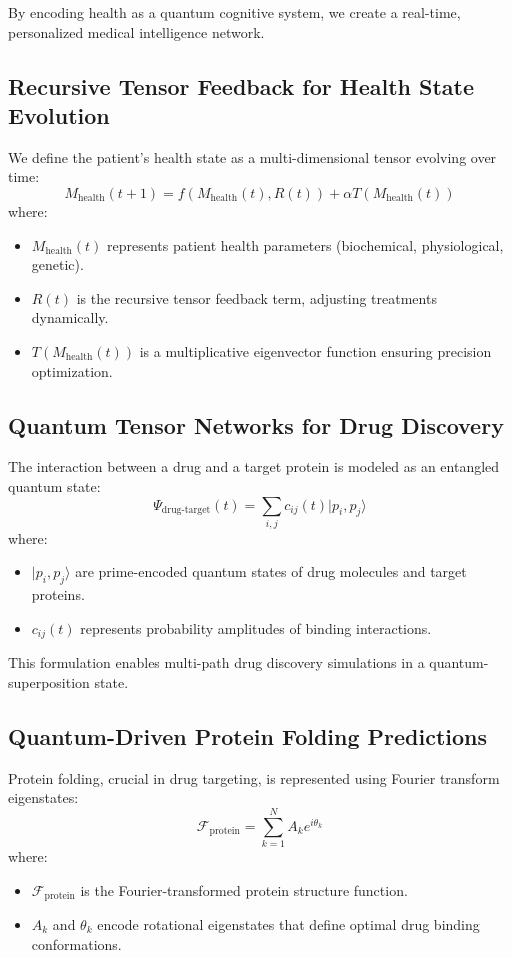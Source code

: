 \documentclass{article}
\theoremstyle{plain}
\begin{document}
\begin{itemize}
\begin{itemize}
By encoding health as a quantum cognitive system, we create a real-time, personalized medical intelligence network.

\subsection{Recursive Tensor Feedback for Health State Evolution}
We define the patient's health state as a multi-dimensional tensor evolving over time:
\begin{equation}
    M_{\text{health}}(t+1) = f(M_{\text{health}}(t), R(t)) + \alpha T(M_{\text{health}}(t))
\end{equation}
where:
\begin{itemize}
    \item \( M_{\text{health}}(t) \) represents patient health parameters (biochemical, physiological, genetic).
    \item \( R(t) \) is the recursive tensor feedback term, adjusting treatments dynamically.
    \item \( T(M_{\text{health}}(t)) \) is a multiplicative eigenvector function ensuring precision optimization.
\end{itemize}

\subsection{Quantum Tensor Networks for Drug Discovery}
The interaction between a drug and a target protein is modeled as an entangled quantum state:
\begin{equation}
    \Psi_{\text{drug-target}}(t) = \sum_{i,j} c_{ij}(t) | p_i, p_j \rangle
\end{equation}
where:
\begin{itemize}
    \item \( | p_i, p_j \rangle \) are prime-encoded quantum states of drug molecules and target proteins.
    \item \( c_{ij}(t) \) represents probability amplitudes of binding interactions.
\end{itemize}

This formulation enables multi-path drug discovery simulations in a quantum-superposition state.

\subsection{Quantum-Driven Protein Folding Predictions}
Protein folding, crucial in drug targeting, is represented using Fourier transform eigenstates:
\begin{equation}
    \mathcal{F}_{\text{protein}} = \sum_{k=1}^{N} A_k e^{i\theta_k}
\end{equation}
where:
\begin{itemize}
    \item \( \mathcal{F}_{\text{protein}} \) is the Fourier-transformed protein structure function.
    \item \( A_k \) and \( \theta_k \) encode rotational eigenstates that define optimal drug binding conformations.
\end{itemize}


\end{itemize}
\end{itemize}
\end{document}
